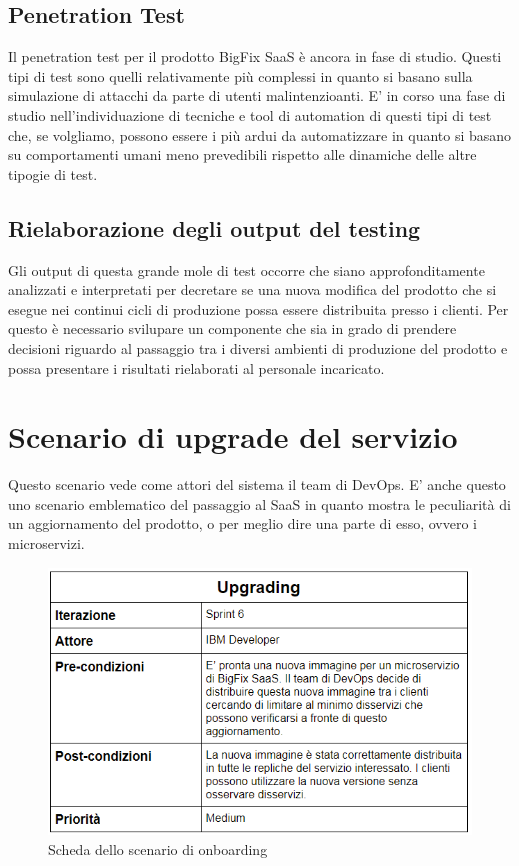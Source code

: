 \subsection{Penetration Test}
Il penetration test per il prodotto BigFix SaaS è ancora in fase di studio. Questi tipi di test sono quelli relativamente più complessi in quanto si basano sulla simulazione di attacchi da parte di utenti malintenzioanti. E' in corso una fase di studio nell'individuazione di tecniche e tool di automation di questi tipi di test che, se volgliamo, possono essere i più ardui da automatizzare in quanto si basano su comportamenti umani meno prevedibili rispetto alle dinamiche delle altre tipogie di test.

\subsection{Rielaborazione degli output del testing}
Gli output di questa grande mole di test occorre che siano approfonditamente analizzati e interpretati per decretare se una nuova modifica del prodotto che si esegue nei continui cicli di produzione possa essere distribuita presso i clienti. Per questo è necessario svilupare un componente che sia in grado di prendere decisioni riguardo al passaggio tra i diversi ambienti di produzione del prodotto e possa presentare i risultati rielaborati al personale incaricato.

\section{Scenario di upgrade del servizio}
Questo scenario vede come attori del sistema il team di DevOps. E' anche questo uno scenario emblematico del passaggio al SaaS in quanto mostra le peculiarità di un aggiornamento del prodotto, o per meglio dire una parte di esso, ovvero i microservizi.
\begin{figure}[h]
	\centering
	\includegraphics[width=0.7\linewidth]{capitoli/imgs/upgradescenarioScheda}
	\caption{Scheda dello scenario di onboarding}
	\label{fig:upgradescenarioscheda}
\end{figure}
